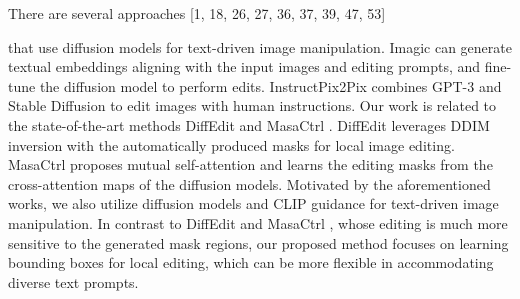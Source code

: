 There are several approaches [1, 18, 26, 27, 36, 37, 39,
47, 53] \cite{avrahami2022blended, gal2022image, kawar2023imagic, kim2022diffusionclip, liu2023more, meng2021sdedit,nichol2021glide,ruiz2023dreambooth}

that use diffusion models for text-driven image manipulation. Imagic \cite{kawar2023imagic} can generate textual embeddings
aligning with the input images and editing prompts, and
fine-tune the diffusion model to perform edits. InstructPix2Pix \cite{brooks2023instructpix2pix} combines GPT-3 \cite{brown2020language} and Stable Diffusion \cite{rombach2022high}
to edit images with human instructions. Our work is related to the state-of-the-art methods DiffEdit \cite{couairon2022diffedit} and MasaCtrl \cite{cao2023masactrl}. DiffEdit  \cite{couairon2022diffedit}  leverages DDIM inversion \cite{dhariwal2021diffusion, song2020denoising}with
the automatically produced masks for local image editing.
MasaCtrl \cite{cao2023masactrl} proposes mutual self-attention and learns the
editing masks from the cross-attention maps of the diffusion
models. Motivated by the aforementioned works, we also
utilize diffusion models and CLIP guidance for text-driven
image manipulation. In contrast to DiffEdit  \cite{couairon2022diffedit}  and MasaCtrl \cite{cao2023masactrl}, whose editing is much more sensitive to the generated mask regions, our proposed method focuses on learning bounding boxes for local editing, which can be more
flexible in accommodating diverse text prompts.